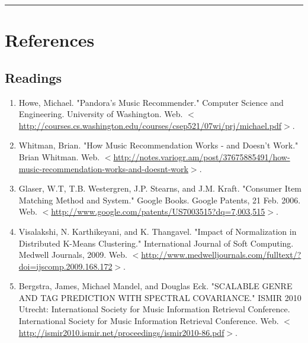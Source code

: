 \documentclass[12pt]{article}
\newcommand{\horizontalLine}{
	\begin{center}
		\hrule width 1.0\textwidth
	\end{center}
}
\begin{document}
\horizontalLine
\section{References}
\label{sec:references}

\subsection{Readings}
\label{subsec:readings}
\begin{enumerate}
    \item Howe, Michael. "Pandora's Music Recommender." Computer Science and Engineering. University of Washington. Web. $<$\href{http://courses.cs.washington.edu/courses/csep521/07wi/prj/michael.pdf}{http://courses.cs.washington.edu/courses/csep521/07wi/prj/michael.pdf}$>$.\vspace{-1ex}
    
    \item Whitman, Brian. "How Music Recommendation Works - and Doesn't Work." Brian Whitman. Web. $<$\href{http://notes.variogr.am/post/37675885491/how-music-recommendation-works-and-doesnt-work}{http://notes.variogr.am/post/37675885491/how-music-recommendation-works-and-doesnt-work}$>$.\vspace{-1ex}

    \item Glaser, W.T, T.B. Westergren, J.P. Stearns, and J.M. Kraft. "Consumer Item Matching Method and System." Google Books. Google Patents, 21 Feb. 2006. Web. $<$\href{http://www.google.com/patents/US7003515?dq=7,003,515}{http://www.google.com/patents/US7003515?dq=7,003,515}$>$.\vspace{-1ex}
    
    \item Visalakshi, N. Karthikeyani, and K. Thangavel. "Impact of Normalization in Distributed K-Means Clustering." International Journal of Soft Computing. Medwell Journals, 2009. Web. $<$\href{http://www.medwelljournals.com/fulltext/?doi=ijscomp.2009.168.172}{http://www.medwelljournals.com/fulltext/?doi=ijscomp.2009.168.172}$>$.\vspace{-1ex}
    
    \item Bergstra, James, Michael Mandel, and Douglas Eck. "SCALABLE GENRE AND TAG PREDICTION WITH SPECTRAL COVARIANCE." ISMIR 2010 Utrecht: International Society for Music Information Retrieval Conference. International Society for Music Information Retrieval Conference. Web. $<$\href{http://ismir2010.ismir.net/proceedings/ismir2010-86.pdf}{http://ismir2010.ismir.net/proceedings/ismir2010-86.pdf}$>$.\vspace{-1ex}
    

\end{enumerate}
\end{document}
